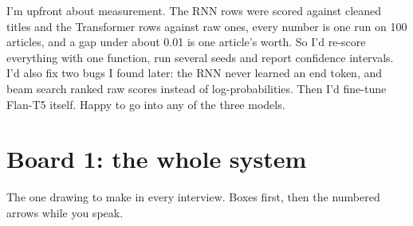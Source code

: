 \begin{sayit}
I'm upfront about measurement. The RNN rows were scored against cleaned titles and the Transformer rows against raw ones, every number is one run on 100 articles, and a gap under about 0.01 is one article's worth. So I'd re-score everything with one function, run several seeds and report confidence intervals. I'd also fix two bugs I found later: the RNN never learned an end token, and beam search ranked raw scores instead of log-probabilities. Then I'd fine-tune Flan-T5 itself. Happy to go into any of the three models.
\end{sayit}

\section{Board 1: the whole system}
The one drawing to make in every interview. Boxes first, then the numbered arrows while you speak.


